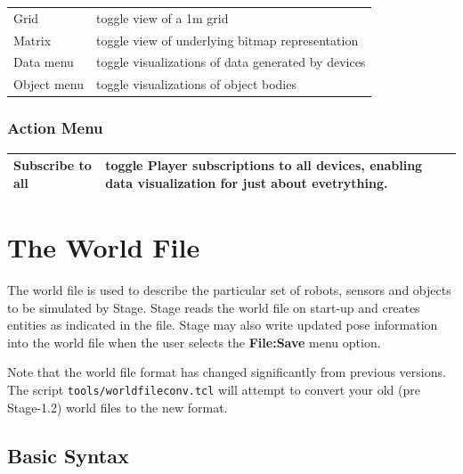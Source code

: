 \documentclass[11pt,twoside]{report}
\begin{document}
\begin{tabular}{|l|l|}
\hline 
Grid & toggle view of a 1m grid\\
Matrix & toggle view of underlying bitmap representation\\
Data menu & toggle visualizations of data generated by devices\\
Object menu & toggle visualizations of object bodies\\
\hline
\end{tabular}

\subsection{Action Menu}

\begin{tabular}{|l|l|}
\hline 
Subscribe to all & toggle Player subscriptions to all devices,
enabling data visualization for just about evetrything. \\
\hline
\end{tabular}


\chapter{The World File}
\label{sec:world}

The world file is used to describe the particular set of robots,
sensors and objects to be simulated by Stage.  Stage reads the world
file on start-up and creates entities as indicated in the file.  Stage
may also write updated pose information into the world file when the
user selects the {\bf File:Save} menu option.

Note that the world file format has changed significantly from
previous versions. The script \verb+tools/worldfileconv.tcl+ will
attempt to convert your old (pre Stage-1.2) world files to the new
format.

\section{Basic Syntax}
\end{document}
